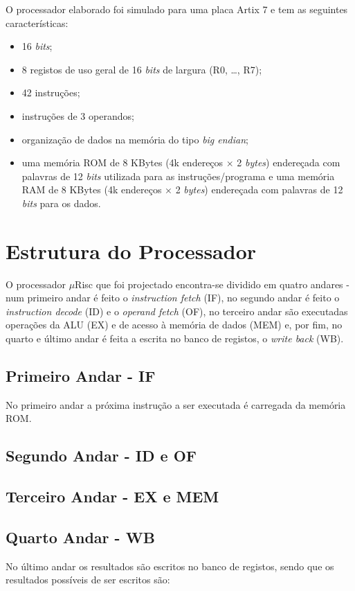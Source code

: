 \documentclass[11pt]{article}
\numberwithin{equation}{section}
\begin{document}
O processador elaborado foi simulado para uma placa Artix 7 e tem as seguintes características:

\vspace{-2mm}

\begin{itemize}
  \item 16 \textit{bits};
  \vspace{-2.5mm}
  \item 8 registos de uso geral de 16 \textit{bits} de largura (R0, \ldots, R7);
  \vspace{-2.5mm}
  \item 42 instruções;
  \vspace{-2.5mm}
  \item instruções de 3 operandos;
  \vspace{-2.5mm}
  \item organização de dados na memória do tipo \textit{big endian};
  \vspace{-2.5mm}
  \item uma memória ROM de 8 KBytes (4k endereços $\times$ 2 \textit{bytes}) endereçada com palavras de 12 \textit{bits} utilizada para as instruções/programa e uma memória RAM de 8 KBytes (4k endereços $\times$ 2 \textit{bytes}) endereçada com palavras de 12 \textit{bits} para os dados.
  
\end{itemize}

\section{Estrutura do Processador}

O processador $\mu$Risc que foi projectado encontra-se dividido em quatro andares - num primeiro andar é feito o \textit{instruction fetch} (IF), no segundo andar é feito o \textit{instruction decode} (ID) e o \textit{operand fetch} (OF), no terceiro andar são executadas operações da ALU (EX) e de acesso à memória de dados (MEM) e, por fim, no quarto e último andar é feita a escrita no banco de registos, o \textit{write back} (WB).

\subsection{Primeiro Andar - IF}

No primeiro andar a próxima instrução a ser executada é carregada da memória ROM. 

\subsection{Segundo Andar - ID e OF}
\subsection{Terceiro Andar - EX e MEM}
\subsection{Quarto Andar - WB}

No último andar os resultados são escritos no banco de registos, sendo que os resultados possíveis de ser escritos são: 

\pagebreak

\listoftodos
\end{document}
